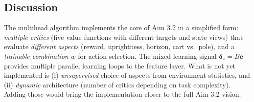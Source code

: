 \documentclass[11pt]{article}
\begin{document}
\subsection{Discussion}

The multihead algorithm implements the core of Aim 3.2 in a simplified form: \emph{multiple critics} (five value functions with different targets and state views) that evaluate \emph{different aspects} (reward, uprightness, horizon, cart vs.\ pole), and a \emph{trainable combination} $w$ for action selection. The mixed learning signal $\boldsymbol{\delta}_z = B\mathbf{e}$ provides multiple parallel learning loops to the feature layer. What is not yet implemented is (i) \emph{unsupervised} choice of aspects from environment statistics, and (ii) \emph{dynamic} architecture (number of critics depending on task complexity). Adding those would bring the implementation closer to the full Aim 3.2 vision.
\end{document}
